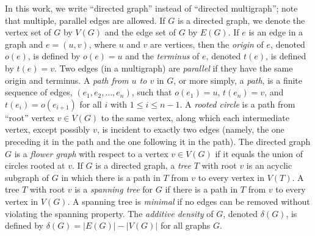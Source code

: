 \documentclass{article}
\begin{document}
In this work, we write ``directed graph'' instead of ``directed multigraph''; note that multiple, parallel edges are allowed.
If $G$ is a directed graph, we denote the vertex set of $G$ by $V(G)$ and the edge set of $G$ by $E(G)$.
If $e$ is an edge in a graph and $e = (u, v)$, where $u$ and $v$ are vertices, then the \emph{origin} of $e$, denoted $o(e)$, is defined by $o(e) = u$ and the \emph{terminus} of $e$, denoted $t(e)$, is defined by $t(e) = v$.
Two edges (in a multigraph) are \emph{parallel} if they have the same origin and terminus.
A \emph{path from $u$ to $v$} in $G$, or more simply, a \emph{path}, is a finite sequence of edges, $(e_1, e_2, \dotsc, e_n)$, such that $o(e_1) = u$, $t(e_n) = v$, and $t(e_i) = o(e_{i + 1})$ for all $i$ with $1 \leq i \leq n - 1$.
A \emph{rooted circle} is a path from ``root'' vertex $v \in V(G)$ to the same vertex, along which each intermediate vertex, except possibly $v$, is incident to exactly two edges (namely, the one preceding it in the path and the one following it in the path).
The directed graph $G$ is a \emph{flower graph} with respect to a vertex $v \in V(G)$ if it equals the union of circles rooted at $v$.
If $G$ is a directed graph, a \emph{tree} $T$ with root $v$ is an acyclic subgraph of $G$ in which there is a path in $T$ from $v$ to every vertex in $V(T)$.
A tree $T$ with root $v$ is a \emph{spanning tree} for $G$ if there is a path in $T$ from $v$ to every vertex in $V(G)$.
A spanning tree is \emph{minimal} if no edges can be removed without violating the spanning property.
The \emph{additive density} of $G$, denoted $\delta(G)$, is defined by $\delta(G) = |E(G)| - |V(G)|$ for all graphs $G$.
\end{document}
